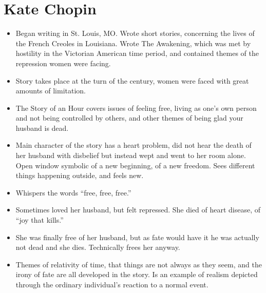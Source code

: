 \documentclass[10pt]{article}
\begin{document}
\section{Kate Chopin}
\begin{itemize}
	\item Began writing in St. Louis, MO.  Wrote short stories, concerning 
		the lives of the French Creoles in Louisiana.  Wrote The 
		Awakening, which was met by hostility in the Victorian 
		American time period, and contained themes of the repression 
		women were facing.
	\item Story takes place at the turn of the century, women were faced 
		with great amounts of limitation.
	\item The Story of an Hour covers issues of feeling free, living as 
		one's own person and not being controlled by others, and other 
		themes of being glad your husband is dead.
	\item Main character of the story has a heart problem, did not hear 
		the death of her husband with disbelief but instead wept and 
		went to her room alone. Open window symbolic of a new 
		beginning, of a new freedom.  Sees different things happening 
		outside, and feels new.
	\item Whispers the words ``free, free, free.''
	\item Sometimes loved her husband, but felt repressed.  She died of 
		heart disease, of ``joy that kills.''
	\item She was finally free of her husband, but as fate would have it 
		he was actually not dead and she dies.  Technically frees her anyway.
	\item Themes of relativity of time, that things are not always as they 
		seem, and the irony of fate are all developed in the story.  
		Is an example of realism depicted through the ordinary 
		individual's reaction to a normal event.
\end{itemize}
\end{document}
